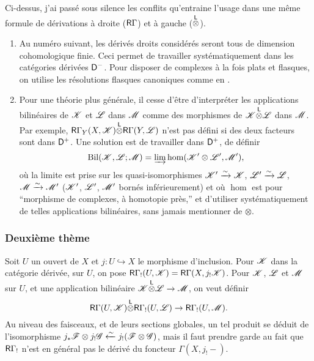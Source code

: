 Ci-dessus, j'ai passé sous silence les conflits qu'entraine l'usage dans une 
même formule de dérivations à droite ($\mathsf{R}\Gamma$) et à gauche 
(${\overset{\mathsf{L}}{\otimes}}$). 
\begin{enumerate}[\indent a)]
  \item Au numéro suivant, les dérivés droits considérés seront tous 
    de dimension cohomologique finie. Ceci permet de travailler 
    systématiquement dans les catégories dérivées $\mathsf{D}^-$. Pour disposer 
    de complexes à la fois plats et flasques, on utilise les résolutions 
    flasques canoniques comme en \cite[XVII]{sga4}. 
  \item Pour une théorie plus générale, il cesse d'être d'interpréter 
    les applications bilinéaires de $\mathscr{K}$ et $\mathscr{L}$ dans $\mathscr{M}$ comme des 
    morphismes de $\mathscr{K}{\overset{\mathsf{L}}{\otimes}}\mathscr{L}$ dans $\mathscr{M}$. Par exemple, 
    $\mathsf{R}\Gamma_Y(X,\mathscr{K}){\overset{\mathsf{L}}{\otimes}}\mathsf{R}\Gamma(Y,\mathscr{L})$ n'est pas défini si des deux 
    facteurs sont dans $\mathsf{D}^+$. Une solution est de travailler dans $\mathsf{D}^+$, de 
    définir 
    \[
      \operatorname{Bil}(\mathscr{K},\mathscr{L};\mathscr{M}) = \varinjlim \hom(\mathscr{K}'\otimes\mathscr{L}',\mathscr{M}') \text{,}
    \]
    où la limite est prise sur les quasi-isomorphismes $\mathscr{K}'\xrightarrow\sim \mathscr{K}$, 
    $\mathscr{L}'\xrightarrow\sim \mathscr{L}$, $\mathscr{M}\xrightarrow\sim \mathscr{M}'$ ($\mathscr{K}'$, $\mathscr{L}'$, $\mathscr{M}'$ bornés 
    inférieurement) et où $\hom$ est pour ``morphisme de complexes, à 
    homotopie près,'' et d'utiliser systématiquement de telles applications 
    bilinéaires, sans jamais mentionner de $\otimes$.  
\end{enumerate}




\subsubsection{Deuxième thème}\label{IV:1-2-4}

Soit $U$ un ouvert de $X$ et $j:U\hookrightarrow X$ le morphisme d'inclusion. 
Pour $\mathscr{K}$ dans la catégorie dérivée, sur $U$, on pose 
$\mathsf{R}\Gamma_!(U,\mathscr{K})=\mathsf{R}\Gamma(X,j_!\mathscr{K})$. Pour $\mathscr{K}$, $\mathscr{L}$ et $\mathscr{M}$ sur $U$, et 
une application bilinéaire $\mathscr{K}{\overset{\mathsf{L}}{\otimes}}\mathscr{L}\to\mathscr{M}$, on veut définir 
\begin{equation}\label{IV:eq:1-2-4-1}
  \mathsf{R}\Gamma(U,\mathscr{K}){\overset{\mathsf{L}}{\otimes}}\mathsf{R}\Gamma_!(U,\mathscr{L})\to\mathsf{R}\Gamma_!(U,\mathscr{M}) \text{.}
\end{equation}
Au niveau des faisceaux, et de leurs sections globales, un tel produit se 
déduit de l'isomorphisme 
$j_*\mathscr{F}\otimes j_!\mathscr{G}\xleftarrow\sim j_!(\mathscr{F}\otimes \mathscr{G})$, mais il faut prendre 
garde au fait que $\mathsf{R}\Gamma_!$ n'est en général pas le dérivé du 
foncteur $\Gamma(X,j_!-)$. 

